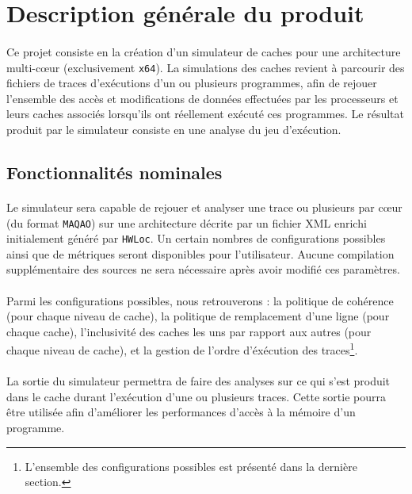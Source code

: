 \section{Description générale du produit}

\paragraph{}
Ce projet consiste en la création d'un simulateur de caches pour une architecture multi-c\oe ur (exclusivement \verb!x64!). La simulations des caches revient à parcourir des fichiers de traces d'exécutions d'un ou plusieurs programmes, afin de rejouer l'ensemble des accès et modifications de données effectuées par les processeurs et leurs caches associés lorsqu'ils ont réellement exécuté ces programmes. Le résultat produit par le simulateur consiste en une analyse du jeu d'exécution.

\subsection{Fonctionnalités nominales}

\paragraph{}
Le simulateur sera capable de rejouer et analyser une trace ou plusieurs par c\oe ur (du format \texttt{MAQAO}) sur une architecture décrite par un fichier XML enrichi initialement généré par \texttt{HWLoc}. Un certain nombres de configurations possibles ainsi que de métriques seront disponibles pour l'utilisateur. Aucune compilation supplémentaire des sources ne sera nécessaire après avoir modifié ces paramètres. 

\paragraph{}
Parmi les configurations possibles, nous retrouverons : la politique de cohérence (pour chaque niveau de cache), la politique de remplacement d'une ligne (pour chaque cache), l'inclusivité des caches les uns par rapport aux autres (pour chaque niveau de cache), et la gestion de l'ordre d'éxécution des traces\footnote{L'ensemble des configurations possibles est présenté dans la dernière section.}.

\paragraph{}
La sortie du simulateur permettra de faire des analyses sur ce qui s'est produit dans le cache durant l'exécution d'une ou plusieurs traces. Cette sortie pourra être utilisée afin d'améliorer les performances d'accès à la mémoire d'un programme.

